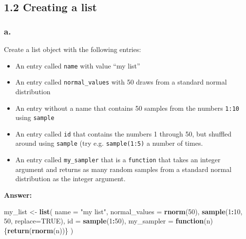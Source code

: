 \documentclass[]{article}
\newenvironment{Shaded}{\begin{snugshade}}{\end{snugshade}}
\newcommand{\ControlFlowTok}[1]{\textcolor[rgb]{0.13,0.29,0.53}{\textbf{#1}}}
\newcommand{\DataTypeTok}[1]{\textcolor[rgb]{0.13,0.29,0.53}{#1}}
\newcommand{\DecValTok}[1]{\textcolor[rgb]{0.00,0.00,0.81}{#1}}
\newcommand{\KeywordTok}[1]{\textcolor[rgb]{0.13,0.29,0.53}{\textbf{#1}}}
\newcommand{\NormalTok}[1]{#1}
\newcommand{\OperatorTok}[1]{\textcolor[rgb]{0.81,0.36,0.00}{\textbf{#1}}}
\newcommand{\OtherTok}[1]{\textcolor[rgb]{0.56,0.35,0.01}{#1}}
\newcommand{\StringTok}[1]{\textcolor[rgb]{0.31,0.60,0.02}{#1}}
\providecommand{\tightlist}{%
  \setlength{\itemsep}{0pt}\setlength{\parskip}{0pt}}
\begin{document}
\hypertarget{creating-a-list}{%
\subsection{1.2 Creating a list}\label{creating-a-list}}

\hypertarget{a.}{%
\subsubsection{a.}\label{a.}}

Create a list object with the following entries:

\begin{itemize}
\tightlist
\item
  An entry called \texttt{name} with value ``my list''
\item
  An entry called \texttt{normal\_values} with 50 draws from a standard
  normal distribution
\item
  An entry without a name that contains 50 samples from the numbers
  \texttt{1:10} using \texttt{sample}
\item
  An entry called \texttt{id} that contains the numbers 1 through 50,
  but shuffled around using \texttt{sample} (try e.g.
  \texttt{sample(1:5)} a number of times.
\item
  An entry called \texttt{my\_sampler} that is a \texttt{function} that
  takes an integer argument and returns as many random samples from a
  standard normal distribution as the integer argument.
\end{itemize}

\textbf{Answer:}

\begin{Shaded}
\begin{Highlighting}[]
\NormalTok{my_list <-}\StringTok{ }\KeywordTok{list}\NormalTok{(}
  \DataTypeTok{name =} \StringTok{"my list"}\NormalTok{,}
  \DataTypeTok{normal_values =} \KeywordTok{rnorm}\NormalTok{(}\DecValTok{50}\NormalTok{),}
  \KeywordTok{sample}\NormalTok{(}\DecValTok{1}\OperatorTok{:}\DecValTok{10}\NormalTok{, }\DecValTok{50}\NormalTok{, }\DataTypeTok{replace=}\OtherTok{TRUE}\NormalTok{),}
  \DataTypeTok{id =} \KeywordTok{sample}\NormalTok{(}\DecValTok{1}\OperatorTok{:}\DecValTok{50}\NormalTok{),}
  \DataTypeTok{my_sampler =} \ControlFlowTok{function}\NormalTok{(n) \{}\KeywordTok{return}\NormalTok{(}\KeywordTok{rnorm}\NormalTok{(n))\}}
\NormalTok{)}
\end{Highlighting}
\end{Shaded}
\end{document}
